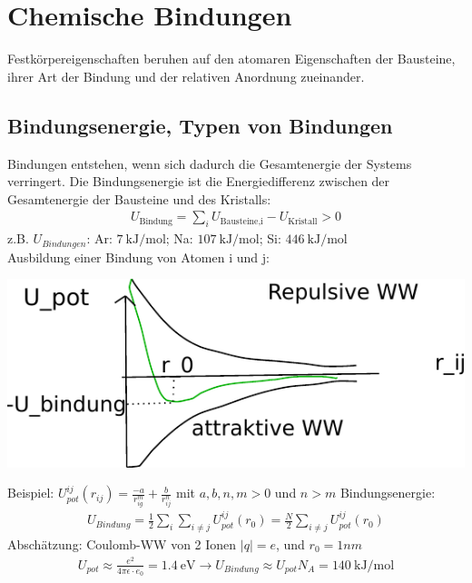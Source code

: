 \newpage
\section{Chemische Bindungen} \label{kap:1}
	Festkörpereigenschaften beruhen auf den atomaren Eigenschaften der Bausteine, ihrer Art der Bindung und der relativen Anordnung zueinander.

\subsection{Bindungsenergie, Typen von Bindungen}\label{kap:1_1}
	Bindungen entstehen, wenn sich dadurch die Gesamtenergie der Systems verringert. Die Bindungsenergie ist die Energiedifferenz zwischen der Gesamtenergie der Bausteine und des Kristalls:
	\begin{align}
		U_{\text{Bindung}} = \sum_i U_{\text{Bausteine,i}}-U_{\text{Kristall}} > 0
	\end{align}
	z.B. $U_{Bindungen}$:  Ar: $ \SI{7}{\kilo\joule\per\mole} $; Na: $ \SI{107}{\kilo\joule\per\mole} $; Si: $ \SI{446}{\kilo\joule\per\mole}$ \\
	Ausbildung einer Bindung von Atomen i und j:
	\begin{center}
		\includegraphics{figures/1_1graph}
	\end{center}
	Beispiel: $U_{pot}^{ij}(r_{ij})= \frac{-a}{r_{ig}^m}+\frac{b}{r_{ij}^n}$ mit $a,b,n,m > 0$ und $n>m$ \newline
	Bindungsenergie:
	\begin{align}
		U_{Bindung} = \frac{1}{2}\sum_i\sum_{i\neq j}U^{ij}_{pot}(r_0) = \frac{N}{2} \sum_{i\neq j} U^{ij}_{pot}(r_0)
	\end{align}
	Abschätzung: Coulomb-WW von 2 Ionen $|q| = e$, und $r_0 = 1nm$
	\begin{align}
		U_{pot} \approx \frac{e^2}{4\pi\epsilon\cdot e_0}=\SI{1.4}{\electronvolt} \rightarrow U_{Bindung} \approx U_{pot} N_A = \SI{140}{\kilo\joule\per\mole}
	\end{align}

